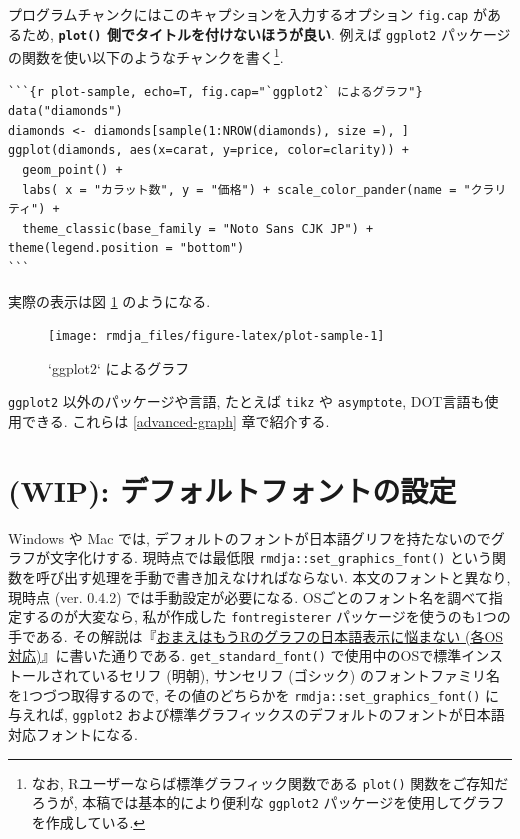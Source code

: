 \documentclass[
  xelatex,ja=standard,jafont=noto]{bxjsbook}
\theoremstyle{definition}
\theoremstyle{definition}
\theoremstyle{definition}
\theoremstyle{definition}
\theoremstyle{remark}
\begin{document}
プログラムチャンクにはこのキャプションを入力するオプション
\texttt{fig.cap} があるため, \textbf{\texttt{plot()}
側でタイトルを付けないほうが良い}. 例えば \texttt{ggplot2}
パッケージの関数を使い以下のようなチャンクを書く\footnote{なお,
  Rユーザーならば標準グラフィック関数である \texttt{plot()}
  関数をご存知だろうが, 本稿では基本的により便利な \texttt{ggplot2}
  パッケージを使用してグラフを作成している.}.

\begin{verbatim}
```{r plot-sample, echo=T, fig.cap="`ggplot2` によるグラフ"}
data("diamonds")
diamonds <- diamonds[sample(1:NROW(diamonds), size =), ]
ggplot(diamonds, aes(x=carat, y=price, color=clarity)) +
  geom_point() +
  labs( x = "カラット数", y = "価格") + scale_color_pander(name = "クラリティ") +
  theme_classic(base_family = "Noto Sans CJK JP") + theme(legend.position = "bottom")
```
\end{verbatim}

実際の表示は図 \ref{fig:plot-sample} のようになる.

\begin{figure}

{\centering \texttt{[image: rmdja\_files/figure-latex/plot-sample-1]} 

}

\caption{`ggplot2` によるグラフ}\label{fig:plot-sample}
\end{figure}

\texttt{ggplot2} 以外のパッケージや言語, たとえば \texttt{tikz} や
\texttt{asymptote}, DOT言語も使用できる. これらは \ref{advanced-graph}
章で紹介する.

\hypertarget{wip-ux30c7ux30d5ux30a9ux30ebux30c8ux30d5ux30a9ux30f3ux30c8ux306eux8a2dux5b9a}{%
\section{(WIP):
デフォルトフォントの設定}\label{wip-ux30c7ux30d5ux30a9ux30ebux30c8ux30d5ux30a9ux30f3ux30c8ux306eux8a2dux5b9a}}

Windows や Mac では,
デフォルトのフォントが日本語グリフを持たないのでグラフが文字化けする.
現時点では最低限 \texttt{rmdja::set\_graphics\_font()}
という関数を呼び出す処理を手動で書き加えなければならない.
本文のフォントと異なり, 現時点 (ver. 0.4.2) では手動設定が必要になる.
OSごとのフォント名を調べて指定するのが大変なら, 私が作成した
\texttt{fontregisterer} パッケージを使うのも1つの手である.
その解説は『\href{https://ill-identified.hatenablog.com/entry/2020/10/03/200618}{おまえはもうRのグラフの日本語表示に悩まない
(各OS対応)}』に書いた通りである. \texttt{get\_standard\_font()}
で使用中のOSで標準インストールされているセリフ (明朝), サンセリフ
(ゴシック) のフォントファミリ名を1つづつ取得するので, その値のどちらかを
\texttt{rmdja::set\_graphics\_font()} に与えれば, \texttt{ggplot2}
および標準グラフィックスのデフォルトのフォントが日本語対応フォントになる.
\end{document}
